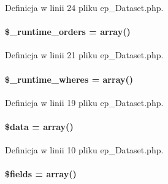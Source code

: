 Definicja w linii 24 pliku ep\-\_\-\-Dataset.\-php.

\hypertarget{classep___dataset_a70162a9ae01f3d977f023a277412a799}{
\paragraph[{\$\-\_\-runtime\-\_\-orders}]{\setlength{\rightskip}{0pt plus 5cm}\$\-\_\-runtime\-\_\-orders = array()\hspace{0.3cm}{\ttfamily [protected]}}}\label{classep___dataset_a70162a9ae01f3d977f023a277412a799}


Definicja w linii 21 pliku ep\-\_\-\-Dataset.\-php.

\hypertarget{classep___dataset_a1752dae6ac25dd0e7f2f01de7523199c}{
\paragraph[{\$\-\_\-runtime\-\_\-wheres}]{\setlength{\rightskip}{0pt plus 5cm}\$\-\_\-runtime\-\_\-wheres = array()\hspace{0.3cm}{\ttfamily [protected]}}}\label{classep___dataset_a1752dae6ac25dd0e7f2f01de7523199c}


Definicja w linii 19 pliku ep\-\_\-\-Dataset.\-php.

\hypertarget{classep___dataset_a6efc15b5a2314dd4b5aaa556a375c6d6}{
\paragraph[{\$data}]{\setlength{\rightskip}{0pt plus 5cm}\$data = array()}}\label{classep___dataset_a6efc15b5a2314dd4b5aaa556a375c6d6}


Definicja w linii 10 pliku ep\-\_\-\-Dataset.\-php.

\hypertarget{classep___dataset_ab2303c817e3b402b77b7f99627b9c319}{
\paragraph[{\$fields}]{\setlength{\rightskip}{0pt plus 5cm}\$fields = array()}}\label{classep___dataset_ab2303c817e3b402b77b7f99627b9c319}


